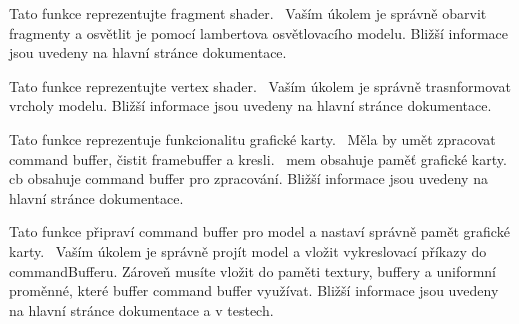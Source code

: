 
\begin{DoxyRefList}
\item[Global \mbox{\hyperlink{drawModel_8hpp_a4fb632ea1b28681c59ef705725611573}{draw\+Model\+\_\+fragment\+Shader}} (\mbox{\hyperlink{structOutFragment}{Out\+Fragment}} \&out\+Fragment, \mbox{\hyperlink{structInFragment}{In\+Fragment}} const \&in\+Fragment, \mbox{\hyperlink{structShaderInterface}{Shader\+Interface}} const \&si)]\label{todo__todo000003}%
%
Tato funkce reprezentujte fragment shader.~\newline
 Vaším úkolem je správně obarvit fragmenty a osvětlit je pomocí lambertova osvětlovacího modelu. Bližší informace jsou uvedeny na hlavní stránce dokumentace.  
\item[Global \mbox{\hyperlink{drawModel_8hpp_a0224939bb488063ed7ba3a75659e4616}{draw\+Model\+\_\+vertex\+Shader}} (\mbox{\hyperlink{structOutVertex}{Out\+Vertex}} \&out\+Vertex, \mbox{\hyperlink{structInVertex}{In\+Vertex}} const \&in\+Vertex, \mbox{\hyperlink{structShaderInterface}{Shader\+Interface}} const \&si)]\label{todo__todo000002}%
%
Tato funkce reprezentujte vertex shader.~\newline
 Vaším úkolem je správně trasnformovat vrcholy modelu. Bližší informace jsou uvedeny na hlavní stránce dokumentace.  
\item[Global \mbox{\hyperlink{gpu_8hpp_a59ea66aa0570ba98e82abbd82433b194}{gpu\+\_\+execute}} (\mbox{\hyperlink{structGPUMemory}{GPUMemory}} \&mem, \mbox{\hyperlink{structCommandBuffer}{Command\+Buffer}} \&cb)]\label{todo__todo000004}%
%
Tato funkce reprezentuje funkcionalitu grafické karty.~\newline
 Měla by umět zpracovat command buffer, čistit framebuffer a kresli.~\newline
 mem obsahuje paměť grafické karty. cb obsahuje command buffer pro zpracování. Bližší informace jsou uvedeny na hlavní stránce dokumentace.  
\item[Global \mbox{\hyperlink{drawModel_8hpp_af46f2952d390459f20fc55a1eb8f4f30}{prepare\+Model}} (\mbox{\hyperlink{structGPUMemory}{GPUMemory}} \&mem, \mbox{\hyperlink{structCommandBuffer}{Command\+Buffer}} \&command\+Buffer, \mbox{\hyperlink{structModel}{Model}} const \&model)]\label{todo__todo000001}%
%
Tato funkce připraví command buffer pro model a nastaví správně pamět grafické karty.~\newline
 Vaším úkolem je správně projít model a vložit vykreslovací příkazy do command\+Bufferu. Zároveň musíte vložit do paměti textury, buffery a uniformní proměnné, které buffer command buffer využívat. Bližší informace jsou uvedeny na hlavní stránce dokumentace a v testech. 
\end{DoxyRefList}